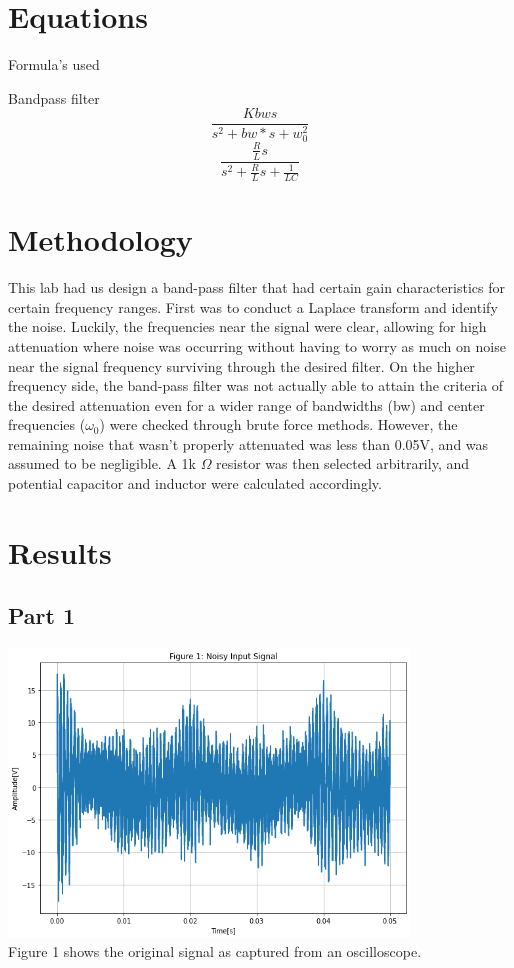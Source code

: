 \documentclass[12pt,a4paper]{article}
\begin{document}
\section{Equations}\label{sec:lit-rev}
Formula's used

Bandpass filter
\[ \frac {K bw s} {s^2 + bw*s + w_0^2} \]
\[\frac{\frac{R}{L} s} {s^2 + \frac{R}{L} s + \frac{1}{LC}}\]



\section{Methodology}\label{sec:meth}
This lab had us design a band-pass filter that had certain gain characteristics for certain frequency ranges.  First was to conduct a Laplace transform and identify the noise. Luckily, the frequencies near the signal were clear, allowing for high attenuation where noise was occurring without having to worry as much on noise near the signal frequency surviving through the desired filter.  On the higher frequency side, the band-pass filter was not actually able to attain the criteria of the desired attenuation even for a wider range of bandwidths (bw) and center frequencies ($\omega_0$) were checked through brute force methods. However, the remaining noise that wasn't properly attenuated was less than 0.05V, and was assumed to be negligible. A 1k $\Omega$ resistor was then selected arbitrarily, and potential capacitor and inductor were calculated accordingly.

\section{Results}\label{sec:res}
\subsection*{Part 1}


\includegraphics[width=0.8\textwidth]{Figure 1.png}\\
Figure 1 shows the original signal as captured from an oscilloscope. \\
\end{document}
